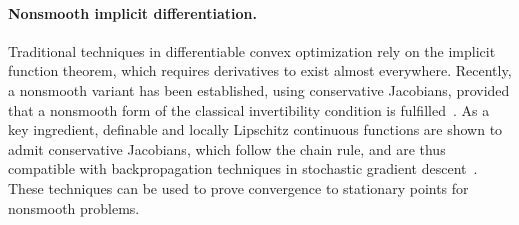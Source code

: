 \documentclass[11pt]{article}
\begin{document}

\paragraph{Nonsmooth implicit differentiation.} Traditional techniques in differentiable convex optimization rely on the implicit function theorem, which requires derivatives to exist almost everywhere. 
Recently, a nonsmooth variant has been established, using conservative Jacobians, provided that a nonsmooth form of the classical invertibility condition is fulfilled~\citep{path-diff}.
As a key ingredient, definable and locally Lipschitz continuous functions are shown to admit conservative Jacobians, which follow the chain rule, and are thus compatible with backpropagation techniques in stochastic gradient descent~\citep{Davis,path-diff}. 
These techniques can be used to prove convergence to stationary points for nonsmooth problems. 

\end{document}

